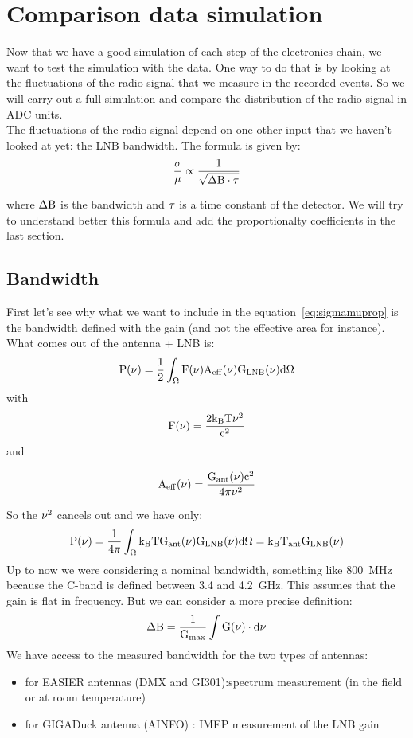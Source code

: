 \section{Comparison data simulation}
Now that  we have a  good simulation of  each step of  the electronics
chain, we  want to test  the simulation with  the data. One way  to do
that is  by looking at  the fluctuations of  the radio signal  that we
measure in the recorded events. So we will carry out a full simulation
and compare the distribution of the  radio signal in ADC units. \\ The
fluctuations of  the radio  signal depend on  one other input  that we
haven't looked  at yet: the LNB bandwidth.  The formula is
given by:
\begin{equation}
  \rm \frac{\sigma}{\mu} \propto \frac{1}{\sqrt{\Delta B \cdot \tau}}
  \label{eq:sigmamuprop}
\end{equation}

where  $\rm \Delta  B$  is the  bandwidth  and $\rm  \tau$  is a  time
constant  of the  detector.  We  will try  to  understand better  this
formula and add the proportionalty coefficients in the last section.
\subsection{Bandwidth}
First   let's   see   why   what   we   want   to   include   in   the
equation~\ref{eq:sigmamuprop} is  the bandwidth defined  with the gain
(and  not the  effective area  for instance).  What comes  out  of the
antenna + LNB is:
\begin{equation}
   \rm P(\nu) = \frac{1}{2}\int_\Omega F(\nu) A_{eff}(\nu) G_{LNB}(\nu)d\Omega
\end{equation}
with 
\begin{equation}
  \rm F(\nu) = \frac{2k_B T \nu^2}{c^2}
\end{equation}
and 

\begin{equation}
  \rm A_{eff}(\nu) = \frac{ G_{ant}(\nu)c^2 }{4\pi \nu^2 }
\end{equation}


So the  $\rm \nu^2$ cancels  out and we  have only:
\begin{equation}
   \rm P(\nu) = \frac{1}{4\pi}\int_\Omega k_B T G_{ant}(\nu) G_{LNB}(\nu) d\Omega= k_B T_{ant} G_{LNB}(\nu)
\end{equation}
Up  to now  we were  considering a  nominal bandwidth,  something like
800~MHz because the  C-band is defined between 3.4  and 4.2~GHz.  This
assumes that the gain is flat in frequency. But we can consider a more
precise definition:
\begin{equation}
   \rm \Delta B = \frac{1}{G_{max}} \int G(\nu) \cdot d\nu
   \label{eq:eqdeltab}
\end{equation}
We have access to the measured bandwidth for the two types of antennas:
\begin{itemize}
\item for EASIER antennas (DMX and GI301):spectrum measurement (in the field or at room temperature)
\item for GIGADuck antenna (AINFO) : IMEP measurement of the LNB gain
\end{itemize}

